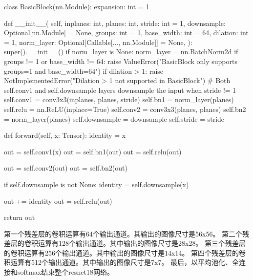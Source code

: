 \begin{codeblock}[language=python]
class BasicBlock(nn.Module):
    expansion: int = 1

    def __init__(
        self,
        inplanes: int,
        planes: int,
        stride: int = 1,
        downsample: Optional[nn.Module] = None,
        groups: int = 1,
        base_width: int = 64,
        dilation: int = 1,
        norm_layer: Optional[Callable[..., nn.Module]] = None,
    ):
        super().__init__()
        if norm_layer is None:
            norm_layer = nn.BatchNorm2d
        if groups != 1 or base_width != 64:
            raise ValueError("BasicBlock only supports groups=1 and base_width=64")
        if dilation > 1:
            raise NotImplementedError("Dilation > 1 not supported in BasicBlock")
        # Both self.conv1 and self.downsample layers downsample the input when stride != 1
        self.conv1 = conv3x3(inplanes, planes, stride)
        self.bn1 = norm_layer(planes)
        self.relu = nn.ReLU(inplace=True)
        self.conv2 = conv3x3(planes, planes)
        self.bn2 = norm_layer(planes)
        self.downsample = downsample
        self.stride = stride

    def forward(self, x: Tensor):
        identity = x

        out = self.conv1(x)
        out = self.bn1(out)
        out = self.relu(out)

        out = self.conv2(out)
        out = self.bn2(out)

        if self.downsample is not None:
            identity = self.downsample(x)

        out += identity
        out = self.relu(out)

        return out

\end{codeblock}

第一个残差层的卷积运算有64个输出通道。其输出的图像尺寸是56x56。
第二个残差层的卷积运算有128个输出通道。其中输出的图像尺寸是28x28。
第三个残差层的卷积运算有256个输出通道。其中输出的图像尺寸是14x14。
第四个残差层的卷积运算有512个输出通道。其中输出的图像尺寸是7x7。
最后，以平均池化、全连接和softmax结束整个resnet18网络。

